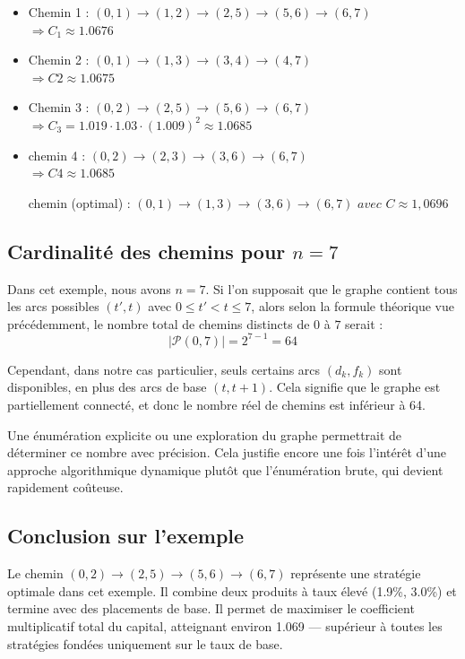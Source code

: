 \documentclass[a4paper,11pt]{article}
\begin{document}
    \begin{itemize}
        \item Chemin 1 : $(0,1) \to (1,2) \to (2,5) \to (5,6) \to (6,7)$ \\
        \hspace{0.5cm} $\Rightarrow C_1 \approx 1.0676 $
        \item Chemin 2 : $(0,1) \to (1,3) \to (3,4) \to (4,7)$ \\
        \hspace{0.5cm} $\Rightarrow C2 \approx 1.0675$ 
        \item Chemin 3 : $(0,2) \to (2,5) \to (5,6) \to (6,7)$ \\
        \hspace{0.5cm} $\Rightarrow C_3 = 1.019 \cdot 1.03 \cdot (1.009)^2 \approx 1.0685$
        \item chemin 4 : $(0,2) \to (2,3) \to (3,6) \to (6,7)$ \\
        \hspace{0.5cm} $\Rightarrow C4 \approx 1.0685$

        chemin (optimal) : $(0,1) \to (1,3) \to (3,6) \to (6,7)$ $ avec$ $ C \approx 1,0696$\\
    \end{itemize}

    \subsection{Cardinalité des chemins pour $n = 7$}
    Dans cet exemple, nous avons $n = 7$. Si l'on supposait que le graphe contient tous les arcs possibles $(t', t)$ avec $0 \leq t' < t \leq 7$, alors selon la formule théorique vue précédemment, le nombre total de chemins distincts de $0$ à $7$ serait :
    \[
    |\mathcal{P}(0, 7)| = 2^{7 - 1} = 64
    \]

    Cependant, dans notre cas particulier, seuls certains arcs $(d_k, f_k)$ sont disponibles, en plus des arcs de base $(t, t+1)$. Cela signifie que le graphe est partiellement connecté, et donc le nombre réel de chemins est inférieur à 64.

    Une énumération explicite ou une exploration du graphe permettrait de déterminer ce nombre avec précision. Cela justifie encore une fois l’intérêt d’une approche algorithmique dynamique plutôt que l’énumération brute, qui devient rapidement coûteuse.


    \subsection{Conclusion sur l’exemple}
    Le chemin $(0,2) \to (2,5) \to (5,6) \to (6,7)$ représente une stratégie optimale dans cet exemple. Il combine deux produits à taux élevé (1.9\%, 3.0\%) et termine avec des placements de base. Il permet de maximiser le coefficient multiplicatif total du capital, atteignant environ 1.069 — supérieur à toutes les stratégies fondées uniquement sur le taux de base.
\end{document}
